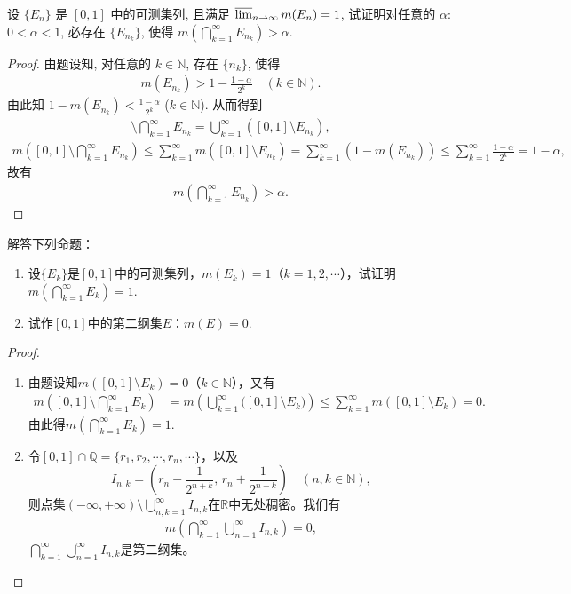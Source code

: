 \documentclass[../../main.tex]{subfiles}%
\begin{document}
\begin{example}
设 $\{E_n\}$ 是 $[0,1]$ 中的可测集列, 且满足 $\varlimsup_{n\to\infty}m(E_n)=1$, 试证明对任意的 $\alpha$: $0<\alpha<1$, 必存在 $\{E_{n_k}\}$, 使得 $m\left(\bigcap\limits_{k=1}^{\infty}E_{n_k}\right)>\alpha$.
\end{example}
\begin{proof}
由题设知, 对任意的 $k\in\mathbb{N}$, 存在 $\{n_k\}$, 使得
\begin{align*}
m(E_{n_k})>1-\frac{1-\alpha}{2^k}\quad (k\in\mathbb{N}).
\end{align*}
由此知 $1-m(E_{n_k})<\frac{1-\alpha}{2^k}$ ($k\in\mathbb{N}$). 从而得到
\begin{align*}
[0,1]\setminus\bigcap\limits_{k=1}^{\infty}E_{n_k}=\bigcup\limits_{k=1}^{\infty}([0,1]\setminus E_{n_k}),
\end{align*}
\begin{align*}
m\left([0,1]\setminus\bigcap\limits_{k=1}^{\infty}E_{n_k}\right)\leqslant\sum\limits_{k=1}^{\infty}m([0,1]\setminus E_{n_k})
=\sum\limits_{k=1}^{\infty}(1-m(E_{n_k}))\leqslant\sum\limits_{k=1}^{\infty}\frac{1-\alpha}{2^k}=1-\alpha,
\end{align*}
故有
\begin{align*}
m\left(\bigcap\limits_{k=1}^{\infty}E_{n_k}\right)>\alpha.
\end{align*}
\end{proof}

\begin{example}
解答下列命题：
\begin{enumerate}[(1)]
\item 设$\{E_k\}$是$[0,1]$中的可测集列，$m(E_k)=1$（$k=1,2,\cdots$），试证明$m\left(\bigcap\limits_{k=1}^{\infty}E_k\right)=1$.

\item 试作$[0,1]$中的第二纲集$E$：$m(E)=0$.
\end{enumerate}
\end{example}
\begin{proof}
\begin{enumerate}[(1)]
\item 由题设知$m([0,1]\setminus E_k)=0$（$k\in\mathbb{N}$），又有
\begin{align*}
m\left([0,1]\setminus\bigcap\limits_{k=1}^{\infty}E_k\right) &= m\left(\bigcup\limits_{k=1}^{\infty}\bigl([0,1]\setminus E_k\bigr)\right) \leqslant \sum\limits_{k=1}^{\infty}m([0,1]\setminus E_k) = 0.
\end{align*}
由此得$m\left(\bigcap\limits_{k=1}^{\infty}E_k\right)=1$.

\item 令$[0,1]\cap\mathbb{Q}=\{r_1,r_2,\cdots,r_n,\cdots\}$，以及
\[
I_{n,k} = \left(r_n - \frac{1}{2^{n+k}},\, r_n + \frac{1}{2^{n+k}}\right) \quad (n,k\in\mathbb{N}),
\]
则点集$(-\infty,+\infty)\setminus\bigcup\limits_{n,k=1}^{\infty}I_{n,k}$在$\mathbb{R}$中无处稠密。我们有
\begin{align*}
m\left(\bigcap\limits_{k=1}^{\infty}\bigcup\limits_{n=1}^{\infty}I_{n,k}\right) = 0,
\end{align*}
$\bigcap\limits_{k=1}^{\infty}\bigcup\limits_{n=1}^{\infty}I_{n,k}$是第二纲集。
\end{enumerate}
\end{proof}
\end{document}
